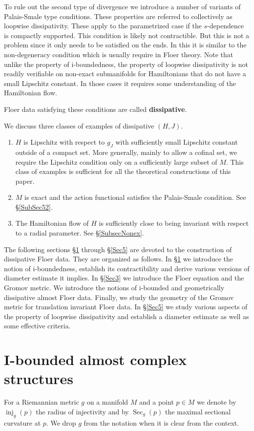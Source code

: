 \documentclass[11pt]{amsart}
\DeclareMathOperator{\Sec}{Sec}
\DeclareMathOperator{\inj}{inj}
\theoremstyle{definition}
\theoremstyle{remark}
\begin{document}
To rule out the second type of divergence we introduce a number of variants of Palais-Smale type conditions. These properties are referred to collectively as loopwise dissipativity. These apply to the parametrized case if the $s$-dependence is compactly supported. This condition is likely not contractible. But this is not a problem since it only needs to be satisfied on the ends. In this it is similar to the non-degeneracy condition which is usually require in Floer theory. Note that unlike the property of i-boundedness, the property of loopwise dissipativity is not readily verifiable on non-exact submanifolds for Hamiltonians that do not have a small Lipschitz constant. In those cases it requires some understanding of the Hamiltonian flow.

Floer data satisfying these conditions are called \textbf{dissipative}.

We discuss three classes of examples of dissipative $(H,J)$.
\begin{enumerate}
\item $H$ is Lipschitz with respect to $g_J$ with sufficiently small Lipschitz constant outside of a compact set. More generally, mainly to allow a cofinal set, we  require the Lipschitz condition only on a sufficiently large subset of $M$. This class of examples is sufficient for all the theoretical constructions of this paper.
\item $M$ is exact and the action functional satisfies the Palais-Smale condition. See \S\ref{SubSec52}.
\item The Hamiltonian flow of $H$ is sufficiently close to being invariant with respect to a radial parameter. See \S\ref{SubsecNonex}.
\end{enumerate}
The following sections \S\ref{Sec1} through \S\ref{Sec5} are devoted to the construction of dissipative Floer data. They are organized as follows. In \S\ref{Sec1} we introduce the notion of i-boundedness, establish its  contractibility and derive various versions of diameter estimate it implies. In \S\ref{Sec3} we introduce the Floer equation and the Gromov metric. We introduce the notions of i-bounded and geometrically dissipative almost Floer data. Finally, we study the geometry of the Gromov metric for translation invariant Floer data. In \S\ref{Sec5} we study various aspects of the property of loopwise dissipativity and establish a diameter estimate as well as some effective criteria.
\section{I-bounded almost complex structures}\label{Sec1}
For a Riemannian metric $g$ on a manifold $M$ and a point $p\in M$ we denote by $\inj_g(p)$ the radius of injectivity and by $\Sec_g(p)$ the maximal sectional curvature at $p$. We drop $g$ from the notation when it is clear from the context.
\end{document}
